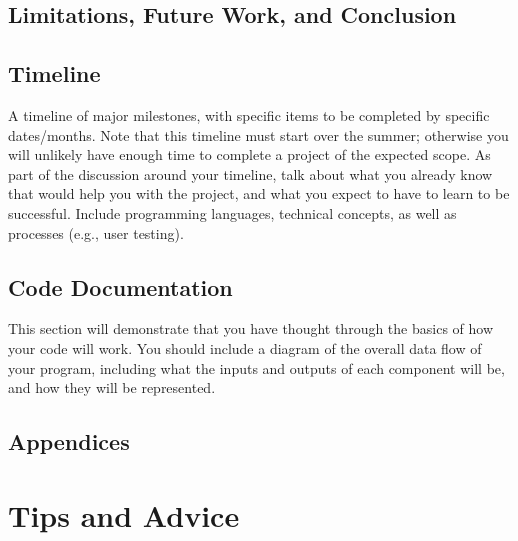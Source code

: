 \documentclass[10pt,twocolumn]{article}
\begin{document}
\subsection{Limitations, Future Work, and Conclusion}

\subsection{Timeline}

A timeline of major milestones, with specific items to be completed by specific dates/months.
Note that this timeline must start over the summer; otherwise you will unlikely have enough time to complete a project of the expected scope.
As part of the discussion around your timeline, talk about what you already know that would help you with the project, and what you expect to have to learn to be successful.
Include programming languages, technical concepts, as well as processes (e.g., user testing).

\subsection{Code Documentation}

This section will demonstrate that you have thought through the basics of how your code will work. You should include a diagram of the overall data flow of your program, including what the inputs and outputs of each component will be, and how they will be represented.

\subsection{Appendices}

\section{Tips and Advice}

\printbibliography 
\end{document}
